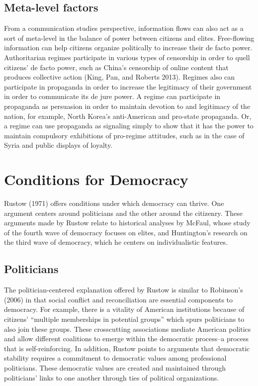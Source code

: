 \documentclass[12pt,]{article}
\begin{document}
\hypertarget{meta-level-factors}{%
\subsection{Meta-level factors}\label{meta-level-factors}}

From a communication studies perspective, information flows can also act
as a sort of meta-level in the balance of power between citizens and
elites. Free-flowing information can help citizens organize politically
to increase their de facto power. Authoritarian regimes participate in
various types of censorship in order to quell citizens' de facto power,
such as China's censorship of online content that produces collective
action (King, Pan, and Roberts 2013). Regimes also can participate in
propaganda in order to increase the legitimacy of their government in
order to communicate its de jure power. A regime can participate in
propaganda as persuasion in order to maintain devotion to and legitimacy
of the nation, for example, North Korea's anti-American and pro-state
propaganda. Or, a regime can use propaganda as signaling simply to show
that it has the power to maintain compulsory exhibitions of pro-regime
attitudes, such as in the case of Syria and public displays of loyalty.

\hypertarget{conditions-for-democracy}{%
\section{Conditions for Democracy}\label{conditions-for-democracy}}

Rustow (1971) offers conditions under which democracy can thrive. One
argument centers around politicians and the other around the citizenry.
These arguments made by Rustow relate to historical analyses by McFaul,
whose study of the fourth wave of democracy focuses on elites, and
Huntington's research on the third wave of democracy, which he centers
on individualistic features.

\hypertarget{politicians}{%
\subsection{Politicians}\label{politicians}}

The politician-centered explanation offered by Rustow is similar to
Robinson's (2006) in that social conflict and reconciliation are
essential components to democracy. For example, there is a vitality of
American institutions because of citizens' ``multiple memberships in
potential groups'' which spurs politicians to also join these groups.
These crosscutting associations mediate American politics and allow
different coalitions to emerge within the democratic process--a process
that is self-reinforcing. In addition, Rustow points to arguments that
democratic stability requires a commitment to democratic values among
professional politicians. These democratic values are created and
maintained through politicians' links to one another through ties of
political organizations.
\end{document}
